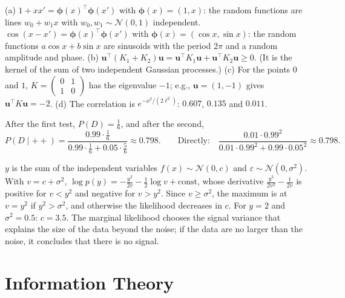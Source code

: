 \documentclass[11pt]{article}
\begin{document}
\begin{description}[leftmargin=0pt, itemsep=0.3em]
    \item[\ref{pr:gp-kernels}.] (a) $1 + xx' = \boldsymbol{\phi}(x)^\top\boldsymbol{\phi}(x')$ with $\boldsymbol{\phi}(x) = (1, x)$: the random functions are lines $w_0 + w_1x$ with $w_0, w_1 \sim \mathcal{N}(0, 1)$ independent. $\cos(x - x') = \boldsymbol{\phi}(x)^\top\boldsymbol{\phi}(x')$ with $\boldsymbol{\phi}(x) = (\cos x, \sin x)$: the random functions $a\cos x + b\sin x$ are sinusoids with the period $2\pi$ and a random amplitude and phase. (b) $\mathbf{u}^\top(K_1 + K_2)\mathbf{u} = \mathbf{u}^\top K_1\mathbf{u} + \mathbf{u}^\top K_2\mathbf{u} \geq 0$. (It is the kernel of the sum of two independent Gaussian processes.) (c) For the points $0$ and $1$, $K = \left(\begin{smallmatrix} 0 & 1 \\ 1 & 0 \end{smallmatrix}\right)$ has the eigenvalue $-1$; e.g., $\mathbf{u} = (1, -1)$ gives $\mathbf{u}^\top K\mathbf{u} = -2$. (d) The correlation is $e^{-x^2/(2\ell^2)}$: $0.607$, $0.135$ and $0.011$.
    \item[\ref{pr:two-tests}.] After the first test, $P(D) = \frac{1}{6}$, and after the second,
    \[P(D \mid {+}{+}) = \frac{0.99 \cdot \frac{1}{6}}{0.99 \cdot \frac{1}{6} + 0.05 \cdot \frac{5}{6}} \approx 0.798. \qquad \text{Directly:} \quad \frac{0.01 \cdot 0.99^2}{0.01 \cdot 0.99^2 + 0.99 \cdot 0.05^2} \approx 0.798.\]
    \item[\ref{pr:gp-evidence}.] $y$ is the sum of the independent variables $f(x) \sim \mathcal{N}(0, c)$ and $\varepsilon \sim \mathcal{N}(0, \sigma^2)$. With $v = c + \sigma^2$, $\log p(y) = -\frac{y^2}{2v} - \frac{1}{2}\log v + \text{const}$, whose derivative $\frac{y^2}{2v^2} - \frac{1}{2v}$ is positive for $v < y^2$ and negative for $v > y^2$. Since $v \geq \sigma^2$, the maximum is at $v = y^2$ if $y^2 > \sigma^2$, and otherwise the likelihood decreases in $c$. For $y = 2$ and $\sigma^2 = 0.5$: $c = 3.5$. The marginal likelihood chooses the signal variance that explains the size of the data beyond the noise; if the data are no larger than the noise, it concludes that there is no signal.
\end{description}

\section*{Information Theory}
\end{document}
